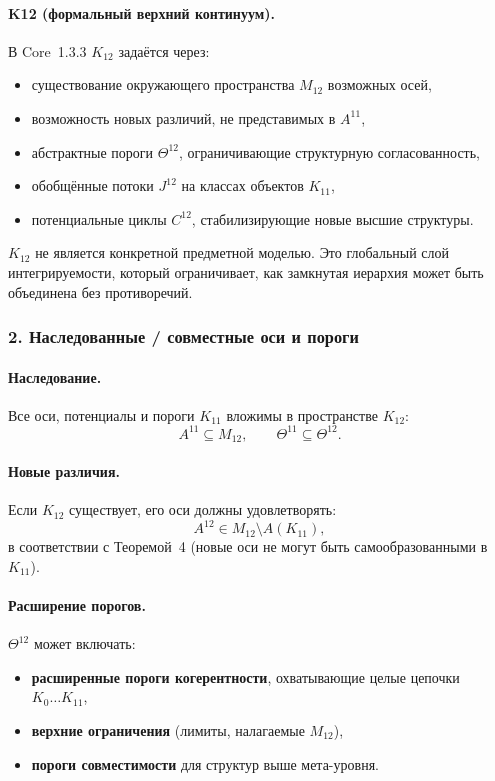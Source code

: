 \paragraph{K12 (формальный верхний континуум).}
В Core~1.3.3 $K_{12}$ задаётся через:
\begin{itemize}
  \item существование окружающего пространства $M_{12}$ возможных осей,
  \item возможность новых различий, не представимых в $A^{11}$,
  \item абстрактные пороги $\Theta^{12}$, ограничивающие структурную
        согласованность,
  \item обобщённые потоки $J^{12}$ на классах объектов $K_{11}$,
  \item потенциальные циклы $C^{12}$, стабилизирующие новые высшие структуры.
\end{itemize}

$K_{12}$ не является конкретной предметной моделью. Это глобальный слой
интегрируемости, который ограничивает, как замкнутая иерархия может быть
объединена без противоречий.

\subsubsection{2. Наследованные / совместные оси и пороги}

\paragraph{Наследование.}
Все оси, потенциалы и пороги $K_{11}$ вложимы в пространстве
$K_{12}$:
\[
A^{11} \subseteq M_{12}, \qquad
\Theta^{11} \subseteq \Theta^{12}.
\]

\paragraph{Новые различия.}
Если $K_{12}$ существует, его оси должны удовлетворять:
\[
A^{12} \in M_{12} \setminus A(K_{11}),
\]
в соответствии с Теоремой~4 (новые оси не могут быть самообразованными в $K_{11}$).

\paragraph{Расширение порогов.}
$\Theta^{12}$ может включать:
\begin{itemize}
  \item \textbf{расширенные пороги когерентности}, охватывающие целые цепочки
        $K_0\dots K_{11}$,
  \item \textbf{верхние ограничения} (лимиты, налагаемые $M_{12}$),
  \item \textbf{пороги совместимости} для структур выше мета-уровня.
\end{itemize}

